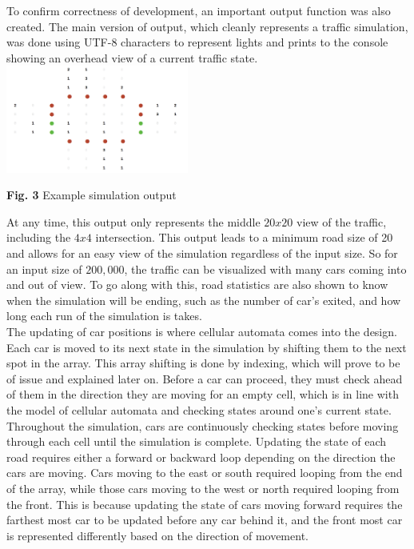 \documentclass[conference]{IEEEtran}
\begin{document}
\hspace*{.2cm} To confirm correctness of development, an important output function was also created. The main version of output, which cleanly represents a traffic simulation, was done using UTF-8 characters to represent lights and prints to the console showing an overhead view of a current traffic state. \\

\includegraphics[width=0.45\textwidth]{output}
\begin{center}
	\textbf{Fig. 3} Example simulation output  \\
\end{center}


At any time, this output only represents the middle $20x20$ view of the traffic, including the $4x4$ intersection. This output leads to a minimum road size of 20 and allows for an easy view of the simulation regardless of the input size. So for an input size of $200,000$, the traffic can be visualized with many cars coming into and out of view. To go along with this, road statistics are also shown to know when the simulation will be ending, such as the number of car's exited, and how long each run of the simulation is takes. \\

\hspace*{.2cm} The updating of car positions is where cellular automata comes into the design. Each car is moved to its next state in the simulation by shifting them to the next spot in the array. This array shifting is done by indexing, which will prove to be of issue and explained later on. Before  a car can proceed, they must check ahead of them in the direction they are moving for an empty cell, which is in line with the model of cellular automata and checking states around one's current state. Throughout the simulation, cars are continuously checking states before moving through each cell until the simulation is complete. Updating the state of each road requires either a forward or backward loop depending on the direction the cars are moving. Cars moving to the east or south required looping from the end of the array, while those cars moving to the west or north required looping from the front. This is because updating the state of cars moving forward   requires the farthest most car to be updated before any car behind it, and the front most car is represented differently based on the direction of movement.\\
\end{document}
